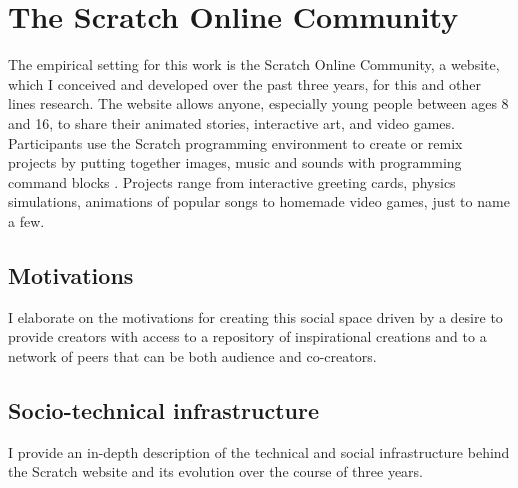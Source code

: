 \chapter{The Scratch Online Community}
The empirical setting for this work is the Scratch Online Community, a website, which I conceived and developed over the past three years, for this and other lines research.
The website allows anyone, especially young people between ages 8 and 16, to share their animated stories, interactive art, and video games. Participants use the Scratch programming environment to create or remix projects by putting together images, music and sounds with programming command blocks \citep{resnick_scratch:_2009}.
Projects range from interactive greeting cards, physics simulations, animations of popular songs to homemade video games, just to name a few.  

\section{Motivations}

I elaborate on the motivations for creating this social space driven by a desire to provide creators with access to a repository of inspirational creations and to a network of peers that can be both audience and co-creators.


\section{Socio-technical infrastructure}
I provide an in-depth description of the technical and social infrastructure behind the Scratch website and its evolution over the course of three years.  

